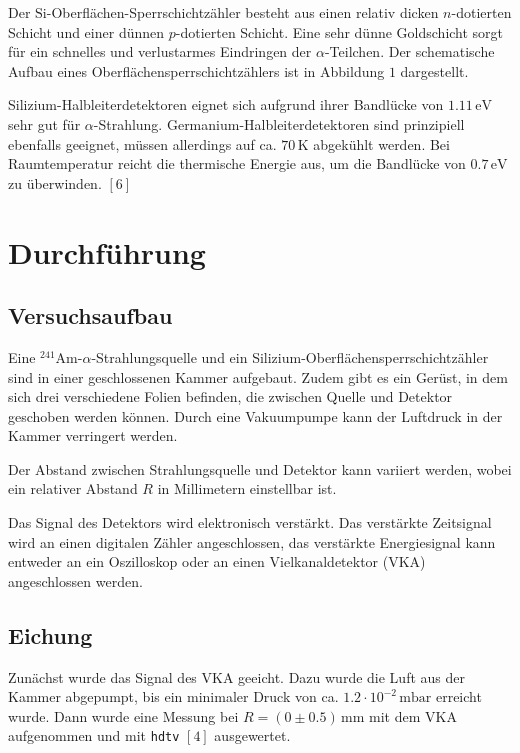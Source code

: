 \documentclass[12pt,a4paper]{scrartcl}
\numberwithin{equation}{section} %
\renewcommand{\[}{} %
\renewcommand{\]}{\noindent} %
\begin{document}
Der \(\mathrm{Si}\)-Oberflächen-Sperrschichtzähler besteht aus einen
relativ dicken \(n\)-dotierten Schicht und einer dünnen \(p\)-dotierten
Schicht. Eine sehr dünne Goldschicht sorgt für ein schnelles und
verlustarmes Eindringen der \(\alpha\)-Teilchen. Der schematische Aufbau
eines Oberflächensperrschichtzählers ist in Abbildung \(1\) dargestellt.

Silizium-Halbleiterdetektoren eignet sich aufgrund ihrer Bandlücke von
\(1.11\mathrm{\,eV}\) sehr gut für \(\alpha\)-Strahlung.
Germanium-Halbleiterdetektoren sind prinzipiell ebenfalls geeignet,
müssen allerdings auf ca. \(70\,\mathrm K\) abgekühlt werden. Bei
Raumtemperatur reicht die thermische Energie aus, um die Bandlücke von
\(0.7\mathrm{\,eV}\) zu überwinden. \([6]\)

\hypertarget{durchfuxfchrung}{%
\section{Durchführung}\label{durchfuxfchrung}}

\hypertarget{versuchsaufbau}{%
\subsection{Versuchsaufbau}\label{versuchsaufbau}}

Eine \(^{241}\mathrm{Am}\)-\(\alpha\)-Strahlungsquelle und ein
Silizium-Oberflächensperrschichtzähler sind in einer geschlossenen
Kammer aufgebaut. Zudem gibt es ein Gerüst, in dem sich drei
verschiedene Folien befinden, die zwischen Quelle und Detektor geschoben
werden können. Durch eine Vakuumpumpe kann der Luftdruck in der Kammer
verringert werden.

Der Abstand zwischen Strahlungsquelle und Detektor kann variiert werden,
wobei ein relativer Abstand \(R\) in Millimetern einstellbar ist.

Das Signal des Detektors wird elektronisch verstärkt. Das verstärkte
Zeitsignal wird an einen digitalen Zähler angeschlossen, das verstärkte
Energiesignal kann entweder an ein Oszilloskop oder an einen
Vielkanaldetektor (VKA) angeschlossen werden.

\hypertarget{eichung}{%
\subsection{Eichung}\label{eichung}}

Zunächst wurde das Signal des VKA geeicht. Dazu wurde die Luft aus der
Kammer abgepumpt, bis ein minimaler Druck von ca.
\(1.2\cdot10^{-2}\mathrm{\,mbar}\) erreicht wurde. Dann wurde eine
Messung bei \(R=(0\pm0.5)\mathrm{\,mm}\) mit dem VKA aufgenommen und mit
\texttt{hdtv} \([4]\) ausgewertet.
\end{document}
